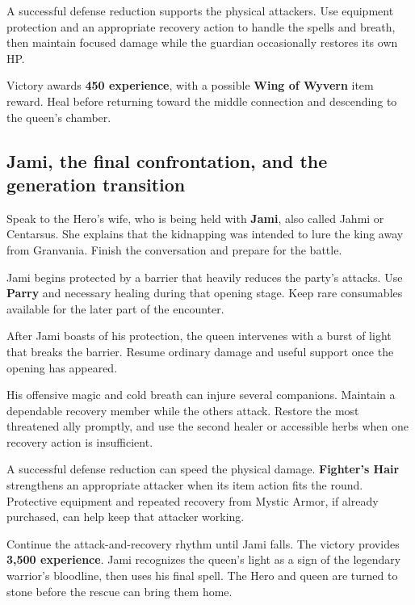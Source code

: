 A successful defense reduction supports the physical attackers.
Use equipment protection and an appropriate recovery action to
handle the spells and breath, then maintain focused damage while
the guardian occasionally restores its own HP.

Victory awards \textbf{450 experience}, with a possible
\textbf{Wing of Wyvern} item reward. Heal before returning
toward the middle connection and descending to the queen's chamber.

\subsection{Jami, the final confrontation, and the generation transition}

Speak to the Hero's wife, who is being held with
\textbf{Jami}, also called Jahmi or Centarsus. She explains
that the kidnapping was intended to lure the king away from
Granvania. Finish the conversation and prepare for the battle.

Jami begins protected by a barrier that heavily reduces the
party's attacks. Use \textbf{Parry} and necessary healing
during that opening stage. Keep rare consumables available for
the later part of the encounter.

After Jami boasts of his protection, the queen intervenes with
a burst of light that breaks the barrier. Resume ordinary damage
and useful support once the opening has appeared.

His offensive magic and cold breath can injure several companions.
Maintain a dependable recovery member while the others attack.
Restore the most threatened ally promptly, and use the second
healer or accessible herbs when one recovery action is insufficient.

A successful defense reduction can speed the physical damage.
\textbf{Fighter's Hair} strengthens an appropriate attacker
when its item action fits the round. Protective equipment and
repeated recovery from Mystic Armor, if already purchased, can
help keep that attacker working.

Continue the attack-and-recovery rhythm until Jami falls.
The victory provides \textbf{3,500 experience}. Jami recognizes
the queen's light as a sign of the legendary warrior's bloodline,
then uses his final spell. The Hero and queen are turned to stone
before the rescue can bring them home.


